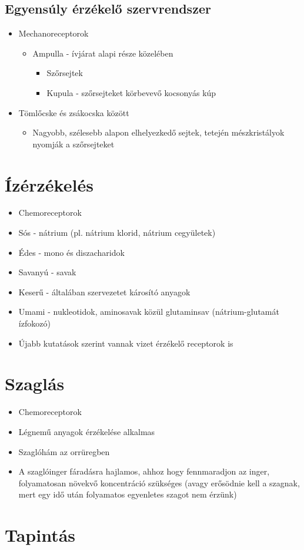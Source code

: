 \documentclass{article}
\begin{document}

\subsection{Egyensúly érzékelő szervrendszer}
\begin{itemize}
    \item Mechanoreceptorok \begin{itemize}
        \item Ampulla - ívjárat alapi része közelében \begin{itemize}
            \item Szőrsejtek 
            \item Kupula - szőrsejteket körbevevő kocsonyás kúp
        \end{itemize}
    \end{itemize}
    \item Tömlőcske és zsákocska között \begin{itemize}
        \item Nagyobb, szélesebb alapon elhelyezkedő sejtek, tetején mészkristályok nyomják a szőrsejteket
    \end{itemize}
\end{itemize}

\section{Ízérzékelés}
\begin{itemize}
    \item Chemoreceptorok
    \item Sós - nátrium (pl. nátrium klorid, nátrium cegyületek)
    \item Édes - mono és diszacharidok 
    \item Savanyú - savak
    \item Keserű - általában szervezetet károsító anyagok
    \item Umami - nukleotidok, aminosavak közül glutaminsav (nátrium-glutamát ízfokozó)
    \item Újabb kutatások szerint vannak vizet érzékelő receptorok is
\end{itemize} 

\section{Szaglás}
\begin{itemize}
    \item Chemoreceptorok
    \item Légnemű anyagok érzékelése alkalmas
    \item Szaglóhám az orrüregben 
    \item A szaglóinger fáradásra hajlamos, ahhoz hogy fennmaradjon az inger, folyamatosan növekvő koncentráció szükséges (avagy erősödnie kell a szagnak, mert egy idő után folyamatos egyenletes szagot nem érzünk)
\end{itemize}

\section{Tapintás}
\end{document}

